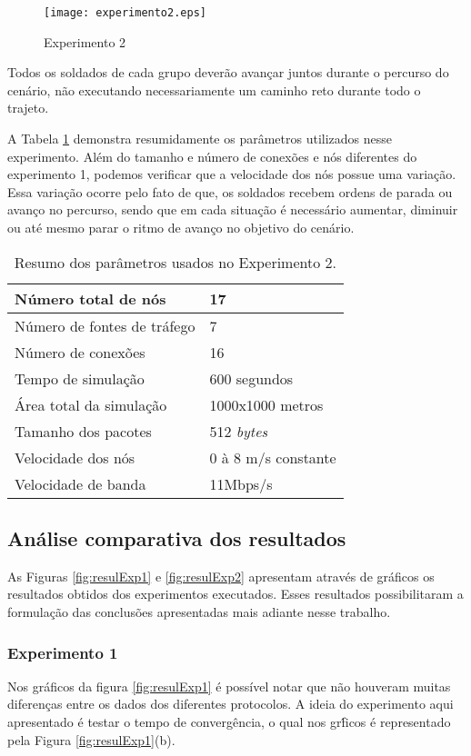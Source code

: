 \begin{figure}[H]
	\centering
	\texttt{[image: experimento2.eps]}
	\caption{Experimento 2}
	\label{figExp2}
\end{figure}

Todos os soldados de cada grupo dever\~ao avan\c{c}ar juntos durante o percurso do cen\'ario, n\~ao executando necessariamente um caminho reto durante todo o trajeto.

A Tabela \ref{tabParamExp2} demonstra resumidamente os par\^ametros utilizados nesse experimento. 
Al\'em do tamanho e n\'umero de conex\~oes e n\'os diferentes do experimento 1, podemos verificar que a velocidade dos n\'os possue uma varia\c{c}\~ao.
Essa varia\c{c}\~ao ocorre pelo fato de que, os soldados recebem ordens de parada ou avan\c{c}o no percurso, sendo que em cada situa\c{c}\~ao \'e necess\'ario aumentar, diminuir ou at\'e mesmo parar o ritmo de avan\c{c}o no objetivo do cen\'ario.

\begin{table}[H]
	\centering
	\caption{Resumo dos par\^ametros usados no Experimento 2.}
	\begin{tabular}{ | l | l | }
		\hline
		N\'umero total de n\'os & 17 \\ \hline
		N\'umero de fontes de tr\'afego & 7 \\ \hline
		N\'umero de conex\~oes & 16 \\ \hline
		Tempo de simula\c{c}\~ao & 600 segundos \\ \hline
		\'Area total da simula\c{c}\~ao & 1000x1000 metros \\ \hline
		Tamanho dos pacotes & 512 \textit{bytes} \\ \hline
		Velocidade dos n\'os & 0 \`a 8 m/s constante \\ \hline
		Velocidade de banda & 11Mbps/s \\ \hline
	\end{tabular}
	\label{tabParamExp2}
\end{table}

\subsection{An\'alise comparativa dos resultados}
As Figuras \ref{fig:resulExp1} e \ref{fig:resulExp2} apresentam atrav\'es de gr\'aficos os resultados obtidos dos experimentos executados. Esses resultados possibilitaram a formula\c{c}\~ao das conclus\~oes apresentadas mais adiante nesse trabalho.

\subsubsection{Experimento 1}
Nos gr\'aficos da figura \ref{fig:resulExp1} \'e poss\'ivel notar que n\~ao houveram muitas diferen\c{c}as entre os dados dos diferentes protocolos. A ideia do experimento aqui apresentado \'e testar o tempo de converg\^encia, o qual nos gr\'ficos \'e representado pela Figura \ref{fig:resulExp1}(b).

